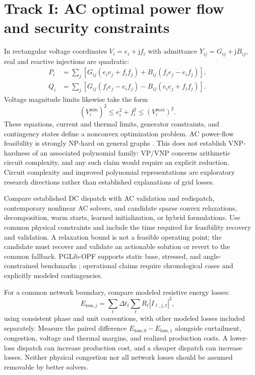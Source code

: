 \documentclass[11pt,letterpaper]{article}
\begin{document}
\section{Track I: AC optimal power flow and security constraints}
In rectangular voltage coordinates $V_i=e_i+\mathrm{j}f_i$ with admittance $Y_{ij}=G_{ij}+\mathrm{j}B_{ij}$, real and reactive injections are quadratic:
\begin{align}
P_i&=\sum_j[G_{ij}(e_ie_j+f_if_j)+B_{ij}(f_ie_j-e_if_j)],\\
Q_i&=\sum_j[G_{ij}(f_ie_j-e_if_j)-B_{ij}(e_ie_j+f_if_j)].
\end{align}
Voltage magnitude limits likewise take the form
\begin{equation}
(V_i^{\min})^2\leq e_i^2+f_i^2\leq(V_i^{\max})^2.
\end{equation}
These equations, current and thermal limits, generator constraints, and contingency states define a nonconvex optimization problem. AC power-flow feasibility is strongly NP-hard on general graphs \cite{bienstock}. This does not establish VNP-hardness of an associated polynomial family: VP/VNP concerns arithmetic circuit complexity, and any such claim would require an explicit reduction. Circuit complexity and improved polynomial representations are exploratory research directions rather than established explanations of grid losses.

Compare established DC dispatch with AC validation and redispatch, contemporary nonlinear AC solvers, and candidate sparse convex relaxations, decomposition, warm starts, learned initialization, or hybrid formulations. Use common physical constraints and include the time required for feasibility recovery and validation. A relaxation bound is not a feasible operating point; the candidate must recover and validate an actionable solution or revert to the common fallback. PGLib-OPF supports static base, stressed, and angle-constrained benchmarks \cite{pglibopf}; operational claims require chronological cases and explicitly modeled contingencies.

For a common network boundary, compare modeled resistive energy losses:
\begin{equation}
E_{\mathrm{loss},j}=\sum_t\Delta t_t\sum_{\ell}R_{\ell}|I_{\ell,j,t}|^2,
\end{equation}
using consistent phase and unit conventions, with other modeled losses included separately. Measure the paired difference $E_{\mathrm{loss},0}-E_{\mathrm{loss},1}$ alongside curtailment, congestion, voltage and thermal margins, and realized production costs. A lower-loss dispatch can increase production cost, and a cheaper dispatch can increase losses. Neither physical congestion nor all network losses should be assumed removable by better solvers.
\end{document}
